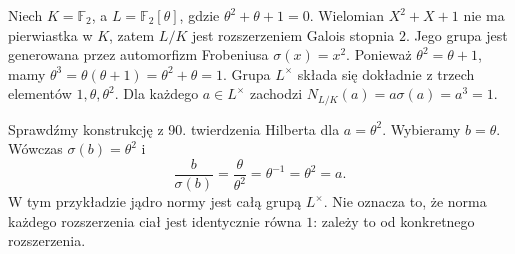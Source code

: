 \begin{przyklad}\label{aa:prz:hilbert90-f4}
Niech $K=\mathbb F_2$, a $L=\mathbb F_2[\theta]$, gdzie
$\theta^2+\theta+1=0$. Wielomian $X^2+X+1$ nie ma
pierwiastka w $K$, zatem $L/K$ jest rozszerzeniem Galois
stopnia $2$. Jego grupa jest generowana przez automorfizm
Frobeniusa $\sigma(x)=x^2$. Ponieważ $\theta^2=\theta+1$,
mamy $\theta^3=\theta(\theta+1)=\theta^2+\theta=1$.
Grupa $L^\times$ składa się dokładnie z trzech elementów
$1,\theta,\theta^2$. Dla każdego $a\in L^\times$ zachodzi
$N_{L/K}(a)=a\sigma(a)=a^3=1$.

Sprawdźmy konstrukcję z 90. twierdzenia Hilberta dla
$a=\theta^2$. Wybieramy $b=\theta$. Wówczas
$\sigma(b)=\theta^2$ i
\[
\frac{b}{\sigma(b)}=\frac{\theta}{\theta^2}
=\theta^{-1}=\theta^2=a.
\]
W tym przykładzie jądro normy jest całą grupą $L^\times$.
Nie oznacza to, że norma każdego rozszerzenia ciał jest
identycznie równa $1$: zależy to od konkretnego rozszerzenia.
\end{przyklad}

